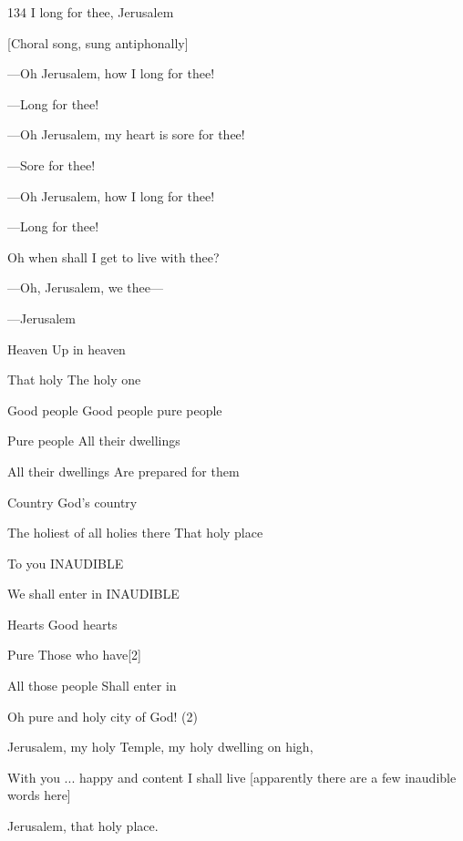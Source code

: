 
134 I long for thee, Jerusalem

[Choral song, sung antiphonally]

---Oh Jerusalem, how I long for thee!

---Long for thee!

---Oh Jerusalem, my heart is sore for thee!

---Sore for thee!

---Oh Jerusalem, how I long for thee!

---Long for thee!

Oh when shall I get to live with thee?

---Oh, Jerusalem, we thee---

---Jerusalem

Heaven  Up in heaven

That holy  The holy one

Good people  Good people pure people

Pure people  All their dwellings

All their dwellings Are prepared for them

Country  God's country

The holiest of all holies there That holy place

To you    INAUDIBLE

We shall enter in  INAUDIBLE

Hearts    Good hearts

Pure    Those who have[2]

All those people  Shall enter in

Oh pure and holy city of God! (2)

Jerusalem, my holy Temple, my holy dwelling on high,

With you ... happy and content I shall live [apparently there are a few inaudible
words here]

Jerusalem, that holy place.

